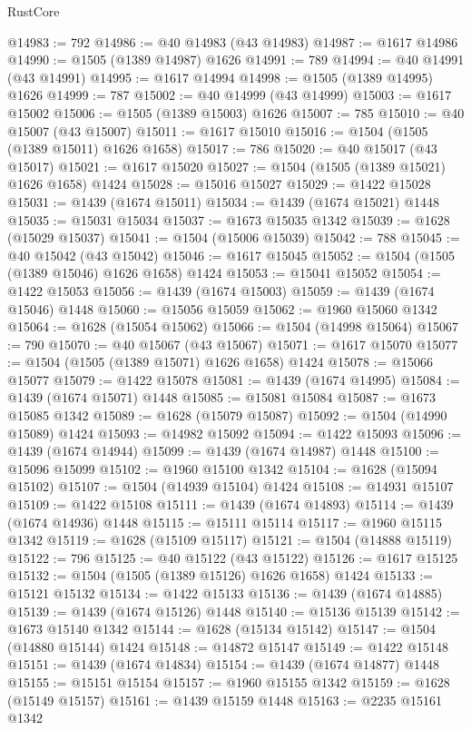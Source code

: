 \begin{lexlean}{RustCore}
\begin{coremodule}
@14983 := 792
@14986 := @40 @14983 (@43 @14983)
@14987 := @1617 @14986
@14990 := @1505 (@1389 @14987) @1626
@14991 := 789
@14994 := @40 @14991 (@43 @14991)
@14995 := @1617 @14994
@14998 := @1505 (@1389 @14995) @1626
@14999 := 787
@15002 := @40 @14999 (@43 @14999)
@15003 := @1617 @15002
@15006 := @1505 (@1389 @15003) @1626
@15007 := 785
@15010 := @40 @15007 (@43 @15007)
@15011 := @1617 @15010
@15016 := @1504 (@1505 (@1389 @15011) @1626 @1658)
@15017 := 786
@15020 := @40 @15017 (@43 @15017)
@15021 := @1617 @15020
@15027 := @1504 (@1505 (@1389 @15021) @1626 @1658) @1424
@15028 := @15016 @15027
@15029 := @1422 @15028
@15031 := @1439 (@1674 @15011)
@15034 := @1439 (@1674 @15021) @1448
@15035 := @15031 @15034
@15037 := @1673 @15035 @1342
@15039 := @1628 (@15029 @15037)
@15041 := @1504 (@15006 @15039)
@15042 := 788
@15045 := @40 @15042 (@43 @15042)
@15046 := @1617 @15045
@15052 := @1504 (@1505 (@1389 @15046) @1626 @1658) @1424
@15053 := @15041 @15052
@15054 := @1422 @15053
@15056 := @1439 (@1674 @15003)
@15059 := @1439 (@1674 @15046) @1448
@15060 := @15056 @15059
@15062 := @1960 @15060 @1342
@15064 := @1628 (@15054 @15062)
@15066 := @1504 (@14998 @15064)
@15067 := 790
@15070 := @40 @15067 (@43 @15067)
@15071 := @1617 @15070
@15077 := @1504 (@1505 (@1389 @15071) @1626 @1658) @1424
@15078 := @15066 @15077
@15079 := @1422 @15078
@15081 := @1439 (@1674 @14995)
@15084 := @1439 (@1674 @15071) @1448
@15085 := @15081 @15084
@15087 := @1673 @15085 @1342
@15089 := @1628 (@15079 @15087)
@15092 := @1504 (@14990 @15089) @1424
@15093 := @14982 @15092
@15094 := @1422 @15093
@15096 := @1439 (@1674 @14944)
@15099 := @1439 (@1674 @14987) @1448
@15100 := @15096 @15099
@15102 := @1960 @15100 @1342
@15104 := @1628 (@15094 @15102)
@15107 := @1504 (@14939 @15104) @1424
@15108 := @14931 @15107
@15109 := @1422 @15108
@15111 := @1439 (@1674 @14893)
@15114 := @1439 (@1674 @14936) @1448
@15115 := @15111 @15114
@15117 := @1960 @15115 @1342
@15119 := @1628 (@15109 @15117)
@15121 := @1504 (@14888 @15119)
@15122 := 796
@15125 := @40 @15122 (@43 @15122)
@15126 := @1617 @15125
@15132 := @1504 (@1505 (@1389 @15126) @1626 @1658) @1424
@15133 := @15121 @15132
@15134 := @1422 @15133
@15136 := @1439 (@1674 @14885)
@15139 := @1439 (@1674 @15126) @1448
@15140 := @15136 @15139
@15142 := @1673 @15140 @1342
@15144 := @1628 (@15134 @15142)
@15147 := @1504 (@14880 @15144) @1424
@15148 := @14872 @15147
@15149 := @1422 @15148
@15151 := @1439 (@1674 @14834)
@15154 := @1439 (@1674 @14877) @1448
@15155 := @15151 @15154
@15157 := @1960 @15155 @1342
@15159 := @1628 (@15149 @15157)
@15161 := @1439 @15159 @1448
@15163 := @2235 @15161 @1342

\end{coremodule}
\end{lexlean}
